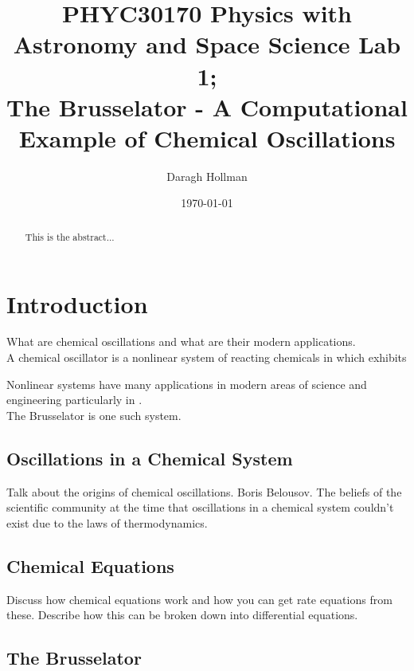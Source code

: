 \documentclass[reprint, amsmath, amssymb, aps]{revtex4-2}
\begin{document}
	
\title{PHYC30170 Physics with Astronomy and Space Science Lab 1;\\The Brusselator - A Computational Example of Chemical Oscillations}

\author{Daragh Hollman}
\date{\today}

\begin{abstract}
This is the abstract...
\end{abstract}

\maketitle

\section{Introduction}

What are chemical oscillations and what are their modern applications.\\

A chemical oscillator is a nonlinear system of reacting chemicals in which exhibits

Nonlinear systems have many applications in modern areas of science and engineering \cite{parada} particularly in .\\

The Brusselator is one such system.

\subsection{Oscillations in a Chemical System}

Talk about the origins of chemical oscillations. Boris Belousov. The beliefs of the scientific community at the time that oscillations in a chemical system couldn't exist due to the laws of thermodynamics.

\subsection{Chemical Equations}

Discuss how chemical equations work and how you can get rate equations from these. Describe how this can be broken down into differential equations.

\subsection{The Brusselator}
\end{document}
